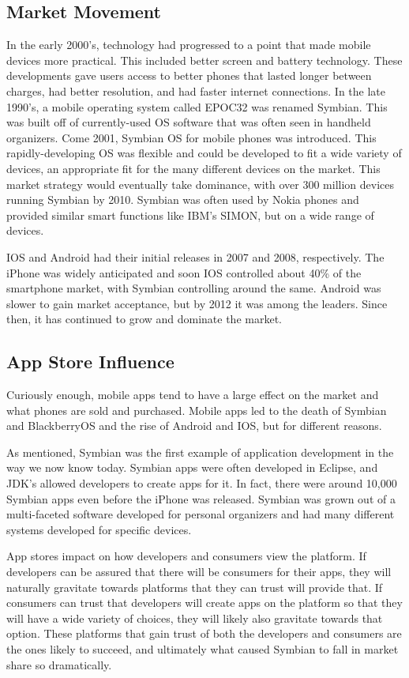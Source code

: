 \documentclass{article}
\begin{document}
\subsection{Market Movement}
\tab In the early 2000's, technology had progressed to a point that made mobile devices more practical. This included better screen and battery technology. These developments gave users access to better phones that lasted longer between charges, had better resolution, and had faster internet connections. In the late 1990's, a mobile operating system called EPOC32 was renamed Symbian. This was built off of currently-used OS software that was often seen in handheld organizers. Come 2001, Symbian OS for mobile phones was introduced. This rapidly-developing OS was flexible and could be developed to fit a wide variety of devices, an appropriate fit for the many different devices on the market.\cite{gilson_2012} This market strategy would eventually take dominance, with over 300 million devices running Symbian by 2010.\cite{ganapati_2010} Symbian was often used by Nokia phones and provided similar smart functions like IBM's SIMON, but on a wide range of devices.

IOS and Android had their initial releases in 2007 and 2008, respectively. The iPhone was widely anticipated and soon IOS controlled about 40\% of the smartphone market, with Symbian controlling around the same.\cite{statcounter_global_stats} Android was slower to gain market acceptance, but by 2012 it was among the leaders. Since then, it has continued to grow and dominate the market.

\subsection{App Store Influence}
\tab Curiously enough, mobile apps tend to have a large effect on the market and what phones are sold and purchased. Mobile apps led to the death of Symbian and BlackberryOS and the rise of Android and IOS, but for different reasons.

As mentioned, Symbian was the first example of application development in the way we now know today. Symbian apps were often developed in Eclipse, and JDK's allowed developers to create apps for it. In fact, there were around 10,000 Symbian apps even before the iPhone was released.\cite{best_2013} Symbian was grown out of a multi-faceted software developed for personal organizers and had many different systems developed for specific devices.

App stores impact on how developers and consumers view the platform. If developers can be assured that there will be consumers for their apps, they will naturally gravitate towards platforms that they can trust will provide that. If consumers can trust that developers will create apps on the platform so that they will have a wide variety of choices, they will likely also gravitate towards that option.\cite{8359170} These platforms that gain trust of both the developers and consumers are the ones likely to succeed, and ultimately what caused Symbian to fall in market share so dramatically.
\end{document}
